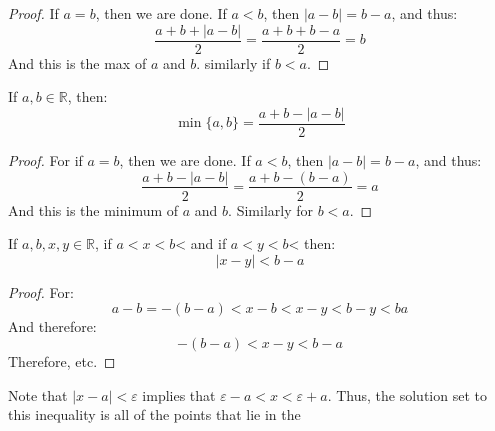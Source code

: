             \begin{proof}
                If $a=b$, then we are done. If $a<b$, then
                $|a-b|=b-a$, and thus:
                \begin{equation}
                    \frac{a+b+|a-b|}{2}=\frac{a+b+b-a}{2}=b
                \end{equation}
                And this is the max of $a$ and $b$. similarly
                if $b<a$.
            \end{proof}
            \begin{theorem}
                If $a,b\in\mathbb{R}$, then:
                \begin{equation}
                    \min\{a,b\}=\frac{a+b-|a-b|}{2}
                \end{equation}
            \end{theorem}
            \begin{proof}
                For if $a=b$, then we are done. If
                $a<b$, then $|a-b|=b-a$, and thus:
                \begin{equation}
                    \frac{a+b-|a-b|}{2}=
                    \frac{a+b-(b-a)}{2}=a
                \end{equation}
                And this is the minimum of $a$ and $b$. Similarly
                for $b<a$.
            \end{proof}
            \begin{theorem}
                If $a,b,x,y\in\mathbb{R}$, if $a<x<b$< and if
                $a<y<b$< then:
                \begin{equation}
                    |x-y|<b-a
                \end{equation}
            \end{theorem}
            \begin{proof}
                For:
                \begin{equation}
                    a-b=\minus(b-a)<
                    x-b<x-y<b-y<ba
                \end{equation}
                And therefore:
                \begin{equation}
                    \minus(b-a)<x-y<b-a
                \end{equation}
                Therefore, etc.
            \end{proof}
            Note that $|x-a|<\varepsilon$ implies that
            $\varepsilon-a<x<\varepsilon+a$. Thus, the solution set
            to this inequality is all of the points that lie in the
